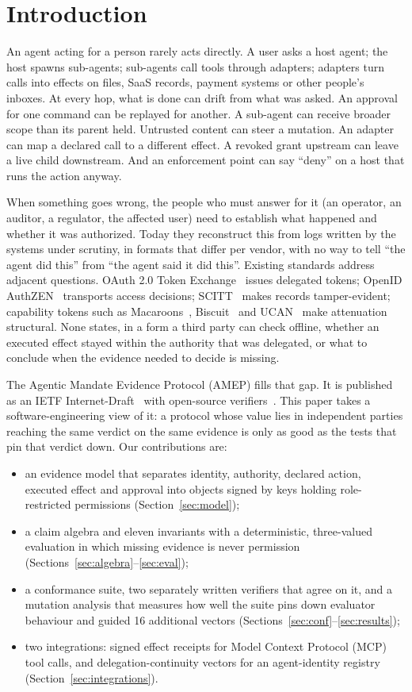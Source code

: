 \documentclass[conference]{IEEEtran}
\begin{document}
\section{Introduction}

An agent acting for a person rarely acts directly. A user asks a host agent; the host spawns sub-agents; sub-agents call tools through adapters; adapters turn calls into effects on files, SaaS records, payment systems or other people's inboxes. At every hop, what is done can drift from what was asked. An approval for one command can be replayed for another. A sub-agent can receive broader scope than its parent held. Untrusted content can steer a mutation. An adapter can map a declared call to a different effect. A revoked grant upstream can leave a live child downstream. And an enforcement point can say ``deny'' on a host that runs the action anyway.

When something goes wrong, the people who must answer for it (an operator, an auditor, a regulator, the affected user) need to establish what happened and whether it was authorized. Today they reconstruct this from logs written by the systems under scrutiny, in formats that differ per vendor, with no way to tell ``the agent did this'' from ``the agent said it did this''. Existing standards address adjacent questions. OAuth 2.0 Token Exchange~\cite{rfc8693} issues delegated tokens; OpenID AuthZEN~\cite{authzen} transports access decisions; SCITT~\cite{scitt} makes records tamper-evident; capability tokens such as Macaroons~\cite{macaroons}, Biscuit~\cite{biscuit} and UCAN~\cite{ucan} make attenuation structural. None states, in a form a third party can check offline, whether an executed effect stayed within the authority that was delegated, or what to conclude when the evidence needed to decide is missing.

The Agentic Mandate Evidence Protocol (AMEP) fills that gap. It is published as an IETF Internet-Draft~\cite{amepid} with open-source verifiers~\cite{amep}. This paper takes a software-engineering view of it: a protocol whose value lies in independent parties reaching the same verdict on the same evidence is only as good as the tests that pin that verdict down. Our contributions are:
\begin{itemize}
\item an evidence model that separates identity, authority, declared action, executed effect and approval into objects signed by keys holding role-restricted permissions (Section~\ref{sec:model});
\item a claim algebra and eleven invariants with a deterministic, three-valued evaluation in which missing evidence is never permission (Sections~\ref{sec:algebra}--\ref{sec:eval});
\item a conformance suite, two separately written verifiers that agree on it, and a mutation analysis that measures how well the suite pins down evaluator behaviour and guided 16 additional vectors (Sections~\ref{sec:conf}--\ref{sec:results});
\item two integrations: signed effect receipts for Model Context Protocol (MCP) tool calls, and delegation-continuity vectors for an agent-identity registry (Section~\ref{sec:integrations}).
\end{itemize}
\end{document}

